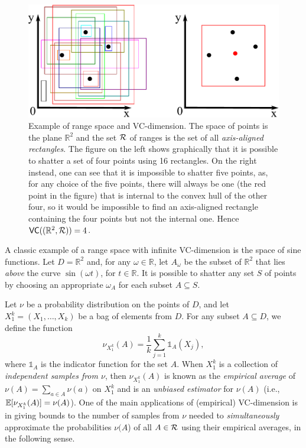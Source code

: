 \begin{figure}[ht]
  \centering
  \includegraphics[width=.75\textwidth,keepaspectratio]{prelims/rectangles}
  \caption{Example of range space and VC-dimension. The space of points is the
  plane $\mathbb{R}^2$ and the set $\mathcal{R}$ of ranges is the set of all
  \emph{axis-aligned rectangles}. The figure on the left shows graphically that
  it is possible to shatter a set of four points using 16 rectangles. On the
  right instead, one can see that it is impossible to shatter five points, as,
  for any choice of the five points, there will always be one (the red point in
  the figure) that is internal to the convex hull of the other four, so it would
  be impossible to find an axis-aligned rectangle containing the four points
  but not the internal one. Hence $\mathsf{VC}((\mathbb{R}^2,\mathcal{R}))=4$.}
  \label{fig:rectangles}
\end{figure}

A classic example of a range space with infinite VC-dimension is the space of sine
functions. Let $D=\mathbb{R}^2$ and, for any $\omega\in\mathbb{R}$, let
$A_{\omega}$ be the subset of $\mathbb{R}^2$ that lies \emph{above} the
curve $\sin(\omega t)$, for $t\in \mathbb{R}$. It is possible to
shatter any set $S$ of points by choosing an appropriate $\omega_A$ for each
subset $A\subseteq S$.

Let $\nu$ be a probability distribution on the points of $D$, and let
$X_1^k=(X_1,\dotsc,X_k)$ be a bag of elements from $D$. For any subset
$A\subseteq D$, we define the function 
\[
\nu_{X_1^k}(A)=\frac{1}{k}\sum_{j=1}^k\mathds{1}_A(X_j),\]
where $\mathds{1}_A$ is the indicator function for the set $A$. When $X_1^k$ is
a collection of \emph{independent samples from $\nu$}, then $\nu_{X_1^k}(A)$ is known as the
\emph{empirical average} of $\nu(A)=\sum_{a\in A}\nu(a)$ on $X_1^k$ and is an
\emph{unbiased estimator} for $\nu(A)$ (i.e.,
$\mathbb{E}[\nu_{X_1^k}(A)]=\nu(A)$). One of the main applications of
(empirical) VC-dimension is in giving bounds to the number of samples from $\nu$
needed to \emph{simultaneously} approximate the probabilities $\nu(A$) of all
$A\in\mathcal{R}$ using their empirical averages, in the following sense.

